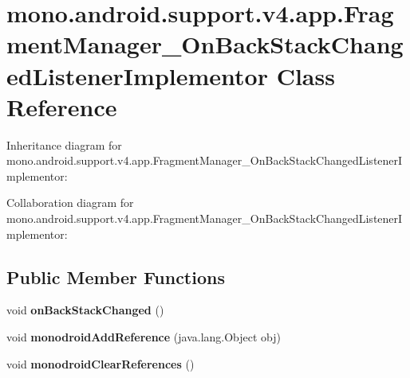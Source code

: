 \hypertarget{classmono_1_1android_1_1support_1_1v4_1_1app_1_1_fragment_manager___on_back_stack_changed_listener_implementor}{}\section{mono.\+android.\+support.\+v4.\+app.\+Fragment\+Manager\+\_\+\+On\+Back\+Stack\+Changed\+Listener\+Implementor Class Reference}
\label{classmono_1_1android_1_1support_1_1v4_1_1app_1_1_fragment_manager___on_back_stack_changed_listener_implementor}


Inheritance diagram for mono.\+android.\+support.\+v4.\+app.\+Fragment\+Manager\+\_\+\+On\+Back\+Stack\+Changed\+Listener\+Implementor\+:


Collaboration diagram for mono.\+android.\+support.\+v4.\+app.\+Fragment\+Manager\+\_\+\+On\+Back\+Stack\+Changed\+Listener\+Implementor\+:
\subsection*{Public Member Functions}
\begin{DoxyCompactItemize}
\item 
\mbox{\label{classmono_1_1android_1_1support_1_1v4_1_1app_1_1_fragment_manager___on_back_stack_changed_listener_implementor_aac1b73d05317d86e387f0387b87775df}} 
void {\bfseries on\+Back\+Stack\+Changed} ()
\item 
\mbox{\label{classmono_1_1android_1_1support_1_1v4_1_1app_1_1_fragment_manager___on_back_stack_changed_listener_implementor_a685912956810c558e72f6494db349d6e}} 
void {\bfseries monodroid\+Add\+Reference} (java.\+lang.\+Object obj)
\item 
\mbox{\label{classmono_1_1android_1_1support_1_1v4_1_1app_1_1_fragment_manager___on_back_stack_changed_listener_implementor_a4272051b3b8101262d9ec7d0aedcc515}} 
void {\bfseries monodroid\+Clear\+References} ()
\end{DoxyCompactItemize}

